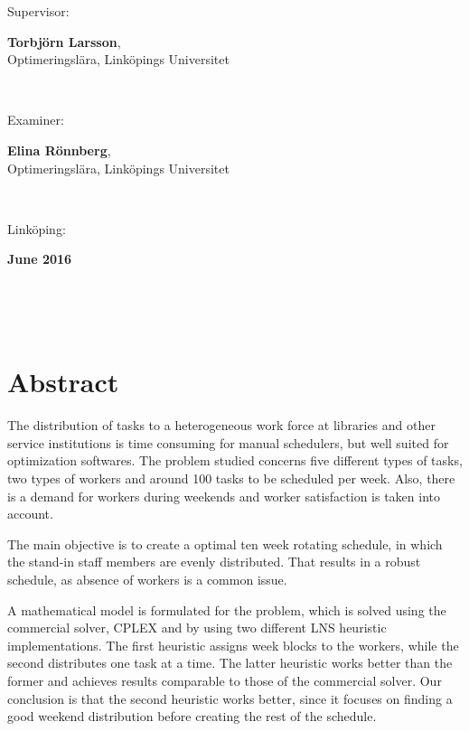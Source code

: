 \documentclass[a4paper, 10pt, twoside, openright]{book}
\newcommand{\putabstract}[0]{%
The distribution of tasks to a heterogeneous work force at libraries and other service institutions is time consuming for manual schedulers, but well suited for optimization softwares. The problem studied concerns five different types of tasks, two types of workers and around 100 tasks to be scheduled per week. Also, there is a demand for workers during weekends and worker satisfaction is taken into account.

The main objective is to create a optimal ten week rotating schedule, in which the stand-in staff members are evenly distributed. That results in a robust schedule, as absence of workers is a common issue.

A mathematical model is formulated for the problem, which is solved using the commercial solver, CPLEX and by using two different LNS heuristic implementations. The first heuristic assigns week blocks to the workers, while the second distributes one task at a time. The latter heuristic works better than the former and achieves results comparable to those of the commercial solver. Our conclusion is that the second heuristic works better, since it focuses on finding a good weekend distribution before creating the rest of the schedule.}
\newcommand{\putthemonth}[0]{June }
\newcommand{\putshortdate}[0]{2016}
\newcommand{\putmydate}[0]{\putthemonth \putshortdate}
\newcommand{\putexaminer}[0]{Elina Rönnberg}
\newcommand{\putsupervisor}[0]{Torbjörn Larsson}
\newcommand{\putdepartment}[0]{Optimeringslära}
\newcommand{\putliu}[0]{Linköpings Universitet}
\begin{document}
{\begin{minipage}{150mm}
                Supervisor:\hspace*{3pt}
                \begin{minipage}[t]{120mm}
                  \textbf{\putsupervisor}, \\\putdepartment, \putliu
                \end{minipage} \\ \vspace*{4mm}
                
                Examiner:\hspace*{3pt}
                \begin{minipage}[t]{120mm}
                  \textbf{\putexaminer}, \\\putdepartment, \putliu
                \end{minipage} \\ \vspace*{4mm}
                
                Linköping:
                \begin{minipage}[t]{70mm}
                  \textbf{\putmydate}
                \end{minipage} \\ \vspace*{4mm}
              \end{minipage} \\ \hfill
}

\maketitle

\phantom{crap}
\thispagestyle{empty}
\pagestyle{empty}

\setlength{\unitlength}{1mm}


\setlength{\unitlength}{1pt}

\pagestyle{fancy}

\chapter*{Abstract}
\putabstract
\end{document}
